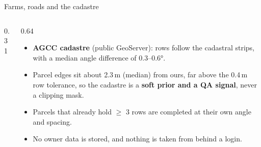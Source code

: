 \begin{frame}{Farms, roads and the cadastre}
  \begin{columns}[T]
    \begin{column}{0.31\textwidth}
      \vspace{3mm}

    \end{column}
    \begin{column}{0.64\textwidth}
      \footnotesize
      \begin{itemize}\setlength{\itemsep}{1.2mm}
        \item \textbf{AGCC cadastre} (public GeoServer): rows follow the cadastral strips, with a median angle difference of 0.3--0.6°.
        \item Parcel edges sit about 2.3\,m (median) from ours, far above the 0.4\,m row tolerance, so the cadastre is a \textbf{soft prior and a QA signal}, never a clipping mask.
        \item Parcels that already hold $\geq$ 3 rows are completed at their own angle and spacing.
        \item No owner data is stored, and nothing is taken from behind a login.
      \end{itemize}
    \end{column}
  \end{columns}
\end{frame}

